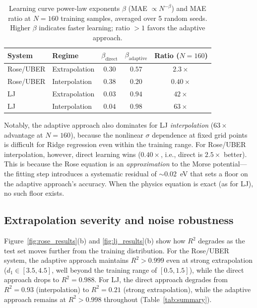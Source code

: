\documentclass[aps,prb,twocolumn,superscriptaddress,longbibliography,floatfix]{revtex4-2}
\begin{document}
\begin{table}[t]
  \caption{Learning curve power-law exponents $\beta$ (MAE $\propto N^{-\beta}$) and MAE ratio at $N = 160$ training samples, averaged over 5 random seeds. Higher $\beta$ indicates faster learning; ratio $> 1$ favors the adaptive approach.}
  \label{tab:learning_curves}
  \begin{ruledtabular}
  \begin{tabular}{llccc}
    System & Regime & $\beta_\mathrm{direct}$ & $\beta_\mathrm{adaptive}$ & Ratio ($N\!=\!160$) \\
    \hline
    Rose/UBER & Extrapolation & $0.30$ & $0.57$ & $2.3\times$ \\
    Rose/UBER & Interpolation & $0.38$ & $0.20$ & $0.40\times$ \\
    LJ & Extrapolation & $0.03$ & $0.94$ & $42\times$ \\
    LJ & Interpolation & $0.04$ & $0.98$ & $63\times$ \\
  \end{tabular}
  \end{ruledtabular}
\end{table}

Notably, the adaptive approach also dominates for LJ \emph{interpolation} ($63\times$ advantage at $N = 160$), because the nonlinear $\sigma$ dependence at fixed grid points is difficult for Ridge regression even within the training range. For Rose/UBER interpolation, however, direct learning wins ($0.40\times$, i.e., direct is $2.5\times$ better). This is because the Rose equation is an \emph{approximation} to the Morse potential---the fitting step introduces a systematic residual of $\sim$0.02~eV that sets a floor on the adaptive approach's accuracy. When the physics equation is exact (as for LJ), no such floor exists.

\subsection{Extrapolation severity and noise robustness}
\label{sec:severity_noise}

Figure~\ref{fig:rose_results}(b) and \ref{fig:lj_results}(b) show how $R^2$ degrades as the test set moves further from the training distribution. For the Rose/UBER system, the adaptive approach maintains $R^2 > 0.999$ even at strong extrapolation ($d_1 \in [3.5, 4.5]$, well beyond the training range of $[0.5, 1.5]$), while the direct approach drops to $R^2 = 0.988$. For LJ, the direct approach degrades from $R^2 = 0.93$ (interpolation) to $R^2 = 0.21$ (strong extrapolation), while the adaptive approach remains at $R^2 > 0.998$ throughout (Table~\ref{tab:summary}).
\end{document}
